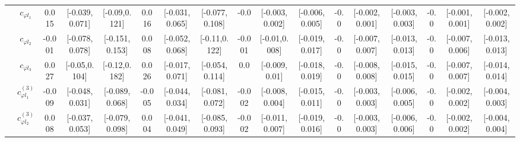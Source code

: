 \documentclass{article}
\begin{document}
\begin{table}[H]
\begin{tabular}{|c|c|c|c|c|c|c|c|c|c|c|c|c|c|c|c|c|}
 & $c_{\varphi l_1}$ & 0.015                             & [-0.039,0.071]                                 & [-0.09,0.121] & 0.016                             & [-0.031,0.065]                                 & [-0.077,0.108] & -0.0                             & [-0.003,0.002]                                 & [-0.006,0.005] & -0.0                             & [-0.002,0.001]                                 & [-0.003,0.003] & -0.0                             & [-0.001,0.001]                                 & [-0.002,0.002] \\ \cline{2-17}
 & $c_{\varphi l_2}$ & -0.001                             & [-0.078,0.078]                                 & [-0.151,0.153] & 0.008                             & [-0.052,0.068]                                 & [-0.11,0.122] & -0.001                             & [-0.01,0.008]                                 & [-0.019,0.017] & -0.0                             & [-0.007,0.007]                                 & [-0.013,0.013] & -0.0                             & [-0.007,0.006]                                 & [-0.013,0.013] \\ \cline{2-17}
 & $c_{\varphi l_3}$ & 0.027                             & [-0.05,0.104]                                 & [-0.12,0.182] & 0.026                             & [-0.017,0.071]                                 & [-0.054,0.114] & 0.0                             & [-0.009,0.01]                                 & [-0.018,0.019] & -0.0                             & [-0.008,0.008]                                 & [-0.015,0.015] & -0.0                             & [-0.007,0.007]                                 & [-0.014,0.014] \\ \cline{2-17}
 & $c_{\varphi l_1}^{(3)}$ & -0.009                             & [-0.048,0.031]                                 & [-0.089,0.068] & -0.005                             & [-0.044,0.034]                                 & [-0.081,0.072] & -0.002                             & [-0.008,0.004]                                 & [-0.015,0.011] & -0.0                             & [-0.003,0.003]                                 & [-0.006,0.005] & -0.0                             & [-0.002,0.002]                                 & [-0.004,0.003] \\ \cline{2-17}
 & $c_{\varphi l_2}^{(3)}$ & 0.008                             & [-0.037,0.053]                                 & [-0.079,0.098] & 0.004                             & [-0.041,0.049]                                 & [-0.085,0.093] & -0.002                             & [-0.011,0.007]                                 & [-0.019,0.016] & -0.0                             & [-0.003,0.003]                                 & [-0.006,0.006] & -0.0                             & [-0.002,0.002]                                 & [-0.004,0.004] \\ \cline{2-17}

\end{tabular}
\end{table}
\end{document}
